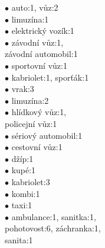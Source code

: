 {{\begin{multicols}{2}
\hspace*{0cm}$\bullet$ auto:1, vůz:2\\
\hspace*{1cm}$\bullet$ limuzína:1\\
\hspace*{1cm}$\bullet$ elektrický vozík:1\\
\hspace*{1cm}$\bullet$ závodní vůz:1,\\
\hspace*{1cm}\phantom{$\bullet$} závodní automobil:1\\
\hspace*{1cm}$\bullet$ sportovní vůz:1\\
\hspace*{1cm}$\bullet$ kabriolet:1, sporťák:1\\
\hspace*{1cm}$\bullet$ vrak:3\\
\hspace*{1cm}$\bullet$ limuzína:2\\
\hspace*{1cm}$\bullet$ hlídkový vůz:1,\\
\hspace*{1cm}\phantom{$\bullet$} policejní vůz:1\\
\hspace*{1cm}$\bullet$ sériový automobil:1\\
\hspace*{1cm}$\bullet$ cestovní vůz:1\\
\hspace*{1cm}$\bullet$ džíp:1\\
\hspace*{1cm}$\bullet$ kupé:1\\
\hspace*{1cm}$\bullet$ kabriolet:3\\
\hspace*{1cm}$\bullet$ kombi:1\\
\hspace*{1cm}$\bullet$ taxi:1\\
\hspace*{1cm}$\bullet$ ambulance:1, sanitka:1,\\
\hspace*{1cm}\phantom{$\bullet$} pohotovost:6, záchranka:1,\\
\hspace*{1cm}\phantom{$\bullet$} sanita:1\\
\end{multicols}
}}


